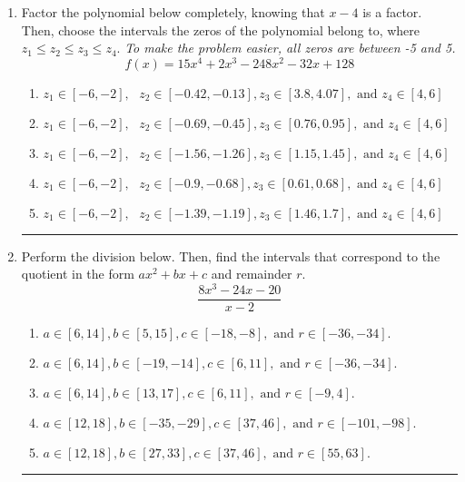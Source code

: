 \documentclass[14pt]{extbook}
\newcommand{\litem}[1]{\item#1\hspace*{-1cm}\rule{\textwidth}{0.4pt}}
\begin{document}
\begin{enumerate}
{\begin{enumerate}[label=\Alph*.]
\end{enumerate} }
\litem{
Factor the polynomial below completely, knowing that $x-4$ is a factor. Then, choose the intervals the zeros of the polynomial belong to, where $z_1 \leq z_2 \leq z_3 \leq z_4$. \textit{To make the problem easier, all zeros are between -5 and 5.}\[ f(x) = 15x^{4} +2 x^{3} -248 x^{2} -32 x + 128 \]\begin{enumerate}[label=\Alph*.]
\item \( z_1 \in [-6, -2], \text{   }  z_2 \in [-0.42, -0.13], z_3 \in [3.8, 4.07], \text{   and   } z_4 \in [4, 6] \)
\item \( z_1 \in [-6, -2], \text{   }  z_2 \in [-0.69, -0.45], z_3 \in [0.76, 0.95], \text{   and   } z_4 \in [4, 6] \)
\item \( z_1 \in [-6, -2], \text{   }  z_2 \in [-1.56, -1.26], z_3 \in [1.15, 1.45], \text{   and   } z_4 \in [4, 6] \)
\item \( z_1 \in [-6, -2], \text{   }  z_2 \in [-0.9, -0.68], z_3 \in [0.61, 0.68], \text{   and   } z_4 \in [4, 6] \)
\item \( z_1 \in [-6, -2], \text{   }  z_2 \in [-1.39, -1.19], z_3 \in [1.46, 1.7], \text{   and   } z_4 \in [4, 6] \)

\end{enumerate} }
\litem{
Perform the division below. Then, find the intervals that correspond to the quotient in the form $ax^2+bx+c$ and remainder $r$.\[ \frac{8x^{3} -24 x -20}{x -2} \]\begin{enumerate}[label=\Alph*.]
\item \( a \in [6, 14], b \in [5, 15], c \in [-18, -8], \text{ and } r \in [-36, -34]. \)
\item \( a \in [6, 14], b \in [-19, -14], c \in [6, 11], \text{ and } r \in [-36, -34]. \)
\item \( a \in [6, 14], b \in [13, 17], c \in [6, 11], \text{ and } r \in [-9, 4]. \)
\item \( a \in [12, 18], b \in [-35, -29], c \in [37, 46], \text{ and } r \in [-101, -98]. \)
\item \( a \in [12, 18], b \in [27, 33], c \in [37, 46], \text{ and } r \in [55, 63]. \)


\end{enumerate}}
\end{enumerate}
\end{document}
